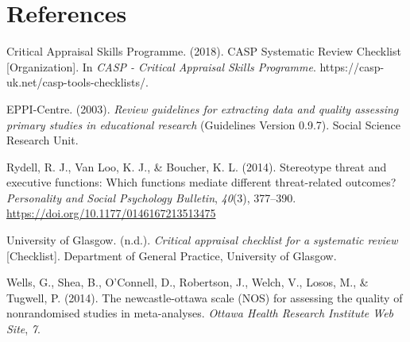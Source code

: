 \documentclass[
  doc, a4paper]{apa7}
\newlength{\cslhangindent}
\newenvironment{CSLReferences}[2] %
 {\begin{list}{}{%
  \setlength{\itemindent}{0pt}
  \setlength{\leftmargin}{0pt}
  \setlength{\parsep}{0pt}
  \ifodd #1
   \setlength{\leftmargin}{\cslhangindent}
   \setlength{\itemindent}{-1\cslhangindent}
  \fi
  \setlength{\itemsep}{#2\baselineskip}}}
 {\end{list}}
\begin{document}
\section{References}\label{references}

\label{refs}
\begin{CSLReferences}{1}{0}
Critical Appraisal Skills Programme. (2018). {CASP Systematic Review Checklist} {[}Organization{]}. In \emph{CASP - Critical Appraisal Skills Programme}. https://casp-uk.net/casp-tools-checklists/.

EPPI-Centre. (2003). \emph{Review guidelines for extracting data and quality assessing primary studies in educational research} (Guidelines Version 0.9.7). Social Science Research Unit.

Rydell, R. J., Van Loo, K. J., \& Boucher, K. L. (2014). Stereotype threat and executive functions: {Which} functions mediate different threat-related outcomes? \emph{Personality and Social Psychology Bulletin}, \emph{40}(3), 377--390. \url{https://doi.org/10.1177/0146167213513475}

University of Glasgow. (n.d.). \emph{Critical appraisal checklist for a systematic review} {[}Checklist{]}. Department of General Practice, University of Glasgow.

Wells, G., Shea, B., O'Connell, D., Robertson, J., Welch, V., Losos, M., \& Tugwell, P. (2014). The newcastle-ottawa scale ({NOS}) for assessing the quality of nonrandomised studies in meta-analyses. \emph{Ottawa Health Research Institute Web Site}, \emph{7}.

\end{CSLReferences}
\end{document}
